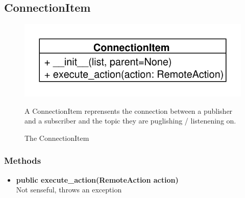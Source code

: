 \subsection{ConnectionItem}
\begin{figure}[htbp]
	\begin{minipage}[t]{7cm}
		\vspace{0pt}
		\centering
		\includegraphics[scale=0.6]{./diagram_pictures/ConnectionItem.pdf}
		\caption{The ConnectionItem}
	\end{minipage}
	\hfill
	\begin{minipage}[t]{8cm}
		\vspace{10pt}
		A ConnectionItem reprensents the connection between a publisher and a
		subscriber and the topic they are puglishing / listenening on.
	\end{minipage}
\end{figure}  
\subsubsection{Methods}
\begin{itemize}
  \item \textbf{public execute\_action(RemoteAction action)}\\ 
  Not senseful, throws an exception
\end{itemize}


